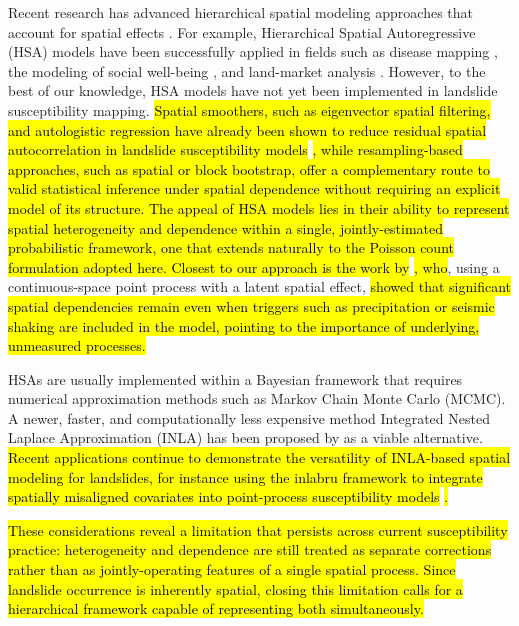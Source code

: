 \documentclass[journal abbreviation, manuscript]{copernicus}
\newcommand{\hlG}[1]{{\sethlcolor{green}\hl{#1}}}
\newcommand{\hlE}[1]{{\sethlcolor{edcyan}\hl{#1}}}
\begin{document}
Recent research has advanced hierarchical spatial modeling approaches that account for spatial effects \citep{dong2015multilevel, morris2019bayesian, lawson2018bayesian}. 
For example, Hierarchical Spatial Autoregressive (HSA) models have been successfully applied in fields such as disease mapping \citep{vranckx2019comparison}, the modeling of social well-being \citep{pierewan2014spatial}, and land-market analysis \citep{dong2015multilevel}. 
However, to the best of our knowledge, HSA models have not yet been implemented in landslide susceptibility mapping. 
\hl{Spatial smoothers, such as eigenvector spatial filtering, and autologistic regression have already been shown to reduce residual spatial autocorrelation in landslide susceptibility models }\citep{li2019eigenvector}\hl{, while resampling-based approaches, such as spatial or block bootstrap, offer a complementary route to valid statistical inference under spatial dependence without requiring an explicit model of its structure. 
The appeal of HSA models lies in their ability to represent spatial heterogeneity and dependence within a single, jointly-estimated probabilistic framework, one that extends naturally to the Poisson count formulation adopted here. 
Closest to our approach is the work by }\citet{lombardo2018point, lombardo2019geostatistical, lombardo2020space}\hl{, who}, using a continuous-space point process with a latent spatial effect, \hlE{showed that significant spatial dependencies remain even when triggers such as precipitation or seismic shaking are included in the model, pointing to the importance of underlying, unmeasured processes.}

HSAs are usually implemented within a Bayesian framework that requires numerical approximation methods such as Markov Chain Monte Carlo (MCMC). 
A newer, faster, and computationally less expensive method Integrated Nested Laplace Approximation (INLA) has been proposed by \citet{rue2005gaussian} as a viable alternative. 
\hlG{Recent applications continue to demonstrate the versatility of INLA-based spatial modeling for landslides, for instance using the inlabru framework to integrate spatially misaligned covariates into point-process susceptibility models }\citep{suen2025river}\hlG{.}

\hlG{These considerations reveal a limitation that persists across current susceptibility practice: heterogeneity and dependence are still treated as separate corrections rather than as jointly-operating features of a single spatial process. 
Since landslide occurrence is inherently spatial, closing this limitation calls for a hierarchical framework capable of representing both simultaneously.}
\end{document}
